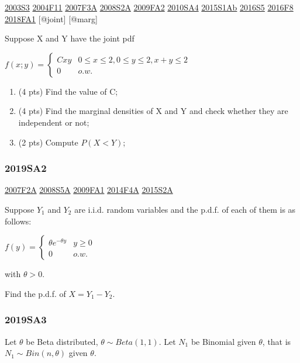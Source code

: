 \documentclass[6pt,Portrait]{article}
\begin{document}
\protect\hyperlink{s3}{2003S3} \protect\hyperlink{f11}{2004F11}
\protect\hyperlink{f3a}{2007F3A} \protect\hyperlink{s2a}{2008S2A}
\protect\hyperlink{fa2}{2009FA2} \protect\hyperlink{sa4-1}{2010SA4}
\protect\hyperlink{s1ab}{2015S1Ab} \protect\hyperlink{s5-4}{2016S5}
\protect\hyperlink{f8-4}{2016F8} \protect\hyperlink{fa1-4}{2018FA1}
{[}@joint{]} {[}@marg{]}

Suppose X and Y have the joint pdf

\(f(x;y) =\begin{cases}Cxy& 0\le x\le 2, 0\le y\le 2, x + y\le 2\\0& o.w.\end{cases}\)

\begin{enumerate}
\def\labelenumi{(\alph{enumi})}
\item
  (4 pts) Find the value of C;
\item
  (4 pts) Find the marginal densities of X and Y and check whether they
  are independent or not;
\item
  (2 pts) Compute \(P(X<Y)\);
\end{enumerate}

\hypertarget{sa2-3}{%
\subsubsection{2019SA2}\label{sa2-3}}

\protect\hyperlink{f2a}{2007F2A} \protect\hyperlink{s5a}{2008S5A}
\protect\hyperlink{fa1}{2009FA1} \protect\hyperlink{f4a-1}{2014F4A}
\protect\hyperlink{s2a-1}{2015S2A}

Suppose \(Y_1\) and \(Y_2\) are i.i.d. random variables and the p.d.f.
of each of them is as follows:

\(f(y)=\begin{cases}\theta e^{-\theta y}& y\ge0\\0& o.w.\end{cases}\)

with \(\theta>0\).

Find the p.d.f. of \(X=Y_1-Y_2\).

\hypertarget{sa3-3}{%
\subsubsection{2019SA3}\label{sa3-3}}

Let \(\theta\) be Beta distributed, \(\theta\sim Beta(1,1)\). Let
\(N_1\) be Binomial given \(\theta\), that is \(N_1\sim Bin(n,\theta)\)
given \(\theta\).
\end{document}
